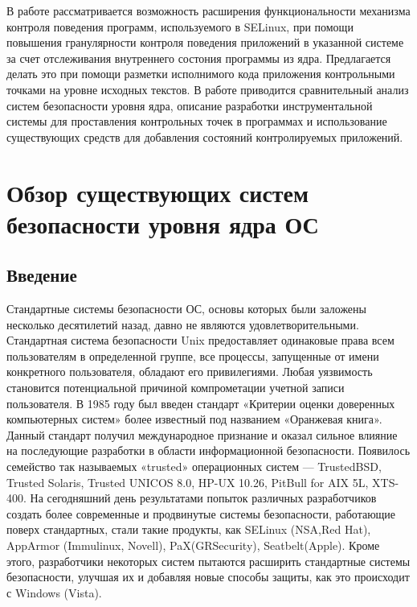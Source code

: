 {} 

{\large В работе рассматривается возможность расширения функциональности 
механизма контроля поведения программ, используемого в SELinux, при 
помощи повышения гранулярности контроля поведения приложений
в указанной системе за счет отслеживания внутреннего состония
программы из ядра. Предлагается делать это при помощи
разметки исполнимого кода приложения контрольными точками 
на уровне исходных текстов. В работе приводится сравнительный 
анализ систем безопасности уровня ядра, описание разработки 
инструментальной системы для проставления контрольных точек 
в программах и использование существующих средств для добавления
состояний контролируемых приложений. 
}

\newpage
\tableofcontents
\newpage

\bigskip
\section{Обзор существующих систем безопасности уровня ядра ОС}
\subsection{Введение}

Стандартные системы безопасности ОС, основы которых 
были заложены несколько десятилетий назад, давно не 
являются удовлетворительными. Стандартная система 
безопасности Unix предоставляет одинаковые права всем 
пользователям в определенной группе, все процессы, 
запущенные от имени конкретного пользователя, обладают 
его привилегиями. Любая уязвимость становится 
потенциальной причиной компрометации учетной записи 
пользователя. В 1985 году был введен стандарт «Критерии 
оценки доверенных компьютерных систем» более известный 
под названием «Оранжевая книга». Данный стандарт получил 
международное признание и оказал сильное влияние на 
последующие разработки в области информационной безопасности. 
Появилось семейство так называемых «trusted» операционных 
систем — TrustedBSD, Trusted Solaris, Trusted UNICOS 8.0, 
HP-UX 10.26, PitBull for AIX 5L, XTS-400. На сегодняшний 
день результатами попыток различных разработчиков создать 
более современные и продвинутые системы безопасности, 
работающие поверх стандартных, стали такие продукты, как 
SELinux (NSA,Red Hat), AppArmor (Immulinux, Novell), 
PaX(GRSecurity), Seatbelt(Apple). Кроме этого, разработчики 
некоторых систем пытаются расширить стандартные системы 
безопасности, улучшая их и добавляя новые способы защиты, 
как это происходит с Windows (Vista). 

